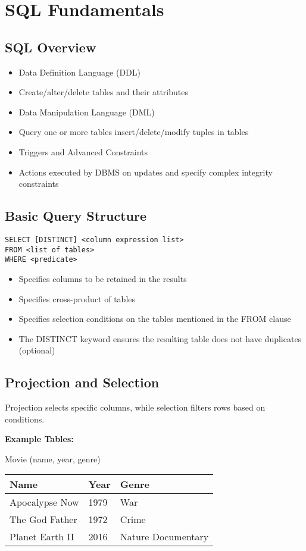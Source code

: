 \documentclass{article}
\begin{document}
\section*{SQL Fundamentals}

\subsection*{SQL Overview}
\begin{itemize}
    \item Data Definition Language (DDL)
    \item Create/alter/delete tables and their attributes
    \item Data Manipulation Language (DML)
    \item Query one or more tables insert/delete/modify tuples in tables
    \item Triggers and Advanced Constraints
    \item Actions executed by DBMS on updates and specify complex integrity constraints
\end{itemize}

\subsection*{Basic Query Structure}
\begin{verbatim}
SELECT [DISTINCT] <column expression list>
FROM <list of tables>
WHERE <predicate>
\end{verbatim}

\begin{itemize}
    \item Specifies columns to be retained in the results
    \item Specifies cross-product of tables
    \item Specifies selection conditions on the tables mentioned in the FROM clause
    \item The DISTINCT keyword ensures the resulting table does not have duplicates (optional)
\end{itemize}

\subsection*{Projection and Selection}
Projection selects specific columns, while selection filters rows based on conditions.

\textbf{Example Tables:}

Movie (name, year, genre)
\begin{tabular}{lll}
\hline
Name & Year & Genre \\
\hline
Apocalypse Now & 1979 & War \\
The God Father & 1972 & Crime \\
Planet Earth II & 2016 & Nature Documentary \\
\hline
\end{tabular}
\end{document}
